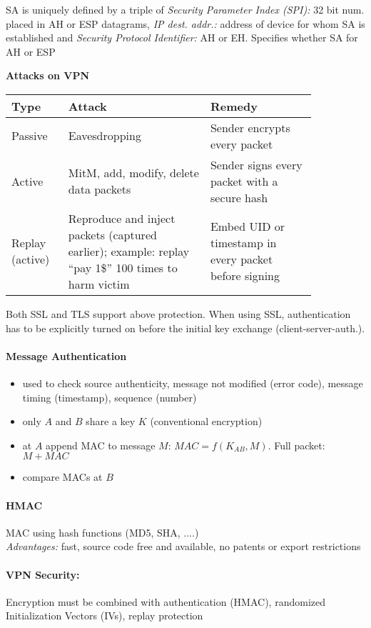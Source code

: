 SA is uniquely defined by a triple of \emph{Security Parameter Index (SPI):} 32 bit num. placed in AH or ESP datagrams, \emph{IP dest. addr.:} address of device for whom SA is established and \emph{Security Protocol Identifier:} AH or EH. Specifies whether SA for AH or ESP

\textbf{Attacks on VPN}

\begin{tabular}{p{0.15\linewidth}p{0.4\linewidth}p{0.3\linewidth}}
Type & Attack & Remedy \\
\hline
\hline
Passive & Eavesdropping & Sender encrypts every packet \\
\hline
Active & MitM, add, modify, delete data packets & Sender signs every packet with a secure hash\\
\hline
Replay (active) & Reproduce and inject packets (captured earlier); example: replay ``pay 1\$'' 100 times to harm victim & Embed UID or timestamp in every packet before signing
\end{tabular}

Both SSL and TLS support above protection. When using SSL, authentication has to be explicitly turned on before the initial key exchange (client-server-auth.).

\paragraph{Message Authentication} 
\begin{itemize}
\item used to check source authenticity, message not modified (error code), message timing (timestamp), sequence (number)
\item only $A$ and $B$ share a key $K$ (conventional encryption) 
\item at $A$ append MAC to message $M$: $MAC = f(K_{AB}, M)$. Full packet: $M + MAC$
\item compare MACs at $B$
\end{itemize}

\paragraph{HMAC} MAC using hash functions (MD5, SHA, ....) \\ \emph{Advantages:} fast, source code free and available, no patents or export restrictions

\paragraph{VPN Security:} Encryption must be combined with authentication (HMAC), randomized Initialization Vectors (IVs), replay protection

